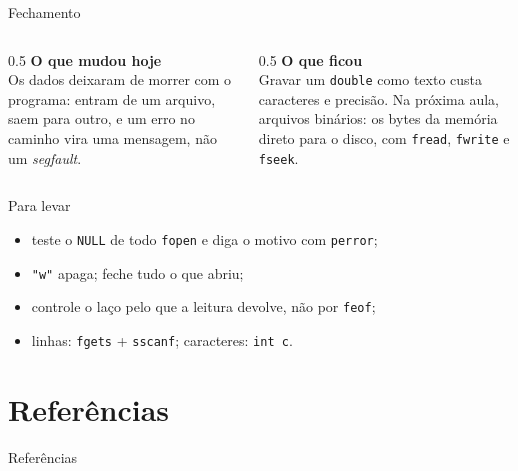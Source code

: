 \documentclass[aspectratio=169]{beamer}
\begin{document}
\begin{frame}{Fechamento}
  \begin{columns}[T]
    \begin{column}{0.5\textwidth}
      \textbf{O que mudou hoje}\\[0.3em]
      \small Os dados deixaram de morrer com o programa: entram de um
      arquivo, saem para outro, e um erro no caminho vira uma mensagem, não
      um \emph{segfault}.
    \end{column}
    \begin{column}{0.5\textwidth}
      \textbf{O que ficou}\\[0.3em]
      \small Gravar um \texttt{double} como texto custa caracteres e
      precisão. Na próxima aula, arquivos binários: os bytes da memória
      direto para o disco, com \texttt{fread}, \texttt{fwrite} e
      \texttt{fseek}.
    \end{column}
  \end{columns}
  \begin{block}{Para levar}
    \begin{itemize}
      \small
      \item teste o \texttt{NULL} de todo \texttt{fopen} e diga o motivo com
        \texttt{perror};
      \item \texttt{"w"} apaga; feche tudo o que abriu;
      \item controle o laço pelo que a leitura devolve, não por \texttt{feof};
      \item linhas: \texttt{fgets} + \texttt{sscanf}; caracteres:
        \texttt{int c}.
    \end{itemize}
  \end{block}
\end{frame}

\section*{Referências}
\begin{frame}[allowframebreaks]{Referências}
  \nocite{*}
  
  
\end{frame}
\end{document}
